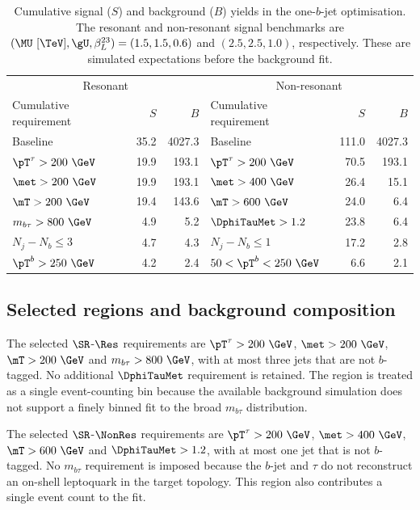 \begin{table}[htbp]
    \centering
    \small
    \caption{Cumulative signal ($S$) and background ($B$) yields in the one-$b$-jet optimisation. The resonant and non-resonant signal benchmarks are $(\MU~[\TeV],\gU,\beta_L^{23})=(1.5,1.5,0.6)$ and $(2.5,2.5,1.0)$, respectively. These are simulated expectations before the background fit.}
    \label{tab:ch7_cutflow}
    \begin{tabular}{lrrlrr}
        \toprule
        \multicolumn{3}{c}{Resonant} & \multicolumn{3}{c}{Non-resonant} \\
        Cumulative requirement & $S$ & $B$ & Cumulative requirement & $S$ & $B$ \\
        \midrule
        Baseline & 35.2 & 4027.3 & Baseline & 111.0 & 4027.3 \\
        $\pT^\tau>200~\GeV$ & 19.9 & 193.1 & $\pT^\tau>200~\GeV$ & 70.5 & 193.1 \\
        $\met>200~\GeV$ & 19.9 & 193.1 & $\met>400~\GeV$ & 26.4 & 15.1 \\
        $\mT>200~\GeV$ & 19.4 & 143.6 & $\mT>600~\GeV$ & 24.0 & 6.4 \\
        $m_{b\tau}>800~\GeV$ & 4.9 & 5.2 & $\DphiTauMet>1.2$ & 23.8 & 6.4 \\
        $N_j-N_b\leq3$ & 4.7 & 4.3 & $N_j-N_b\leq1$ & 17.2 & 2.8 \\
        $\pT^b>250~\GeV$ & 4.2 & 2.4 & $50<\pT^b<250~\GeV$ & 6.6 & 2.1 \\
        \bottomrule
    \end{tabular}
\end{table}

\subsection{Selected regions and background composition}

The selected $\SR$-$\Res$ requirements are $\pT^\tau>200~\GeV$, $\met>200~\GeV$, $\mT>200~\GeV$ and $m_{b\tau}>800~\GeV$, with at most three jets that are not $b$-tagged.
No additional $\DphiTauMet$ requirement is retained.
The region is treated as a single event-counting bin because the available background simulation does not support a finely binned fit to the broad $m_{b\tau}$ distribution.

The selected $\SR$-$\NonRes$ requirements are $\pT^\tau>200~\GeV$, $\met>400~\GeV$, $\mT>600~\GeV$ and $\DphiTauMet>1.2$, with at most one jet that is not $b$-tagged.
No $m_{b\tau}$ requirement is imposed because the $b$-jet and $\tau$ do not reconstruct an on-shell leptoquark in the target topology.
This region also contributes a single event count to the fit.

